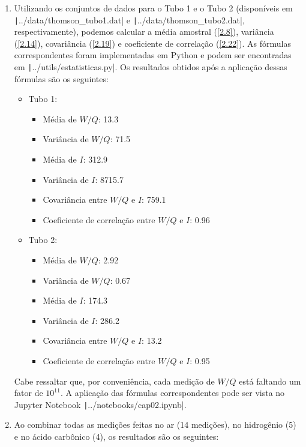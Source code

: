 \begin{enumerate}[label=\textbf{2.\arabic*.}]
	\item Utilizando os conjuntos de dados para o Tubo 1 e o Tubo 2 (disponíveis em \texttt|../data/thomson_tubo1.dat| e \texttt|../data/thomson_tubo2.dat|, respectivamente), podemos calcular a média amostral (\autoref{2.8}), variância (\autoref{2.14}), covariância (\autoref{2.19}) e coeficiente de correlação (\autoref{2.22}). As fórmulas correspondentes foram implementadas em Python e podem ser encontradas em \texttt|../utils/estatisticas.py|. Os resultados obtidos após a aplicação dessas fórmulas são os seguintes:
	
	\begin{itemize}
		\item Tubo 1:
		\begin{itemize}
			\item Média de $W/Q$: 13.3
			\item Variância de $W/Q$: 71.5
			\item Média de $I$: 312.9
			\item Variância de $I$: 8715.7
			\item Covariância entre $W/Q$ e $I$: 759.1
			\item Coeficiente de correlação entre $W/Q$ e $I$: 0.96
		\end{itemize}
		
		\item Tubo 2:
		\begin{itemize}
			\item Média de $W/Q$: 2.92
			\item Variância de $W/Q$: 0.67
			\item Média de $I$: 174.3
			\item Variância de $I$: 286.2
			\item Covariância entre $W/Q$ e $I$: 13.2
			\item Coeficiente de correlação entre $W/Q$ e $I$: 0.95
		\end{itemize}
	\end{itemize}
	
	Cabe ressaltar que, por conveniência, cada medição de $W/Q$ está faltando um fator de $10^{11}$. A aplicação das fórmulas correspondentes pode ser vista no Jupyter Notebook \texttt|../notebooks/cap02.ipynb|.
	
	\item Ao combinar todas as medições feitas no ar (14 medições), no hidrogênio (5) e no ácido carbônico (4), os resultados são os seguintes:
	

\end{enumerate}
